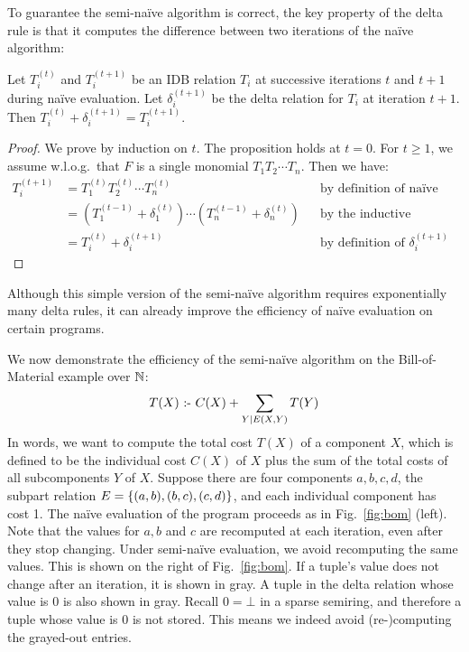 To guarantee the semi-na\"ive algorithm is correct,
the key property of the delta rule is that it computes the difference
 between two iterations of the na\"ive algorithm:
%
\begin{prop}
\label{thm:delta}
Let $T_i^{(t)}$ and $T_i^{(t+1)}$ be an IDB relation $T_i$ 
 at successive iterations $t$ and $t+1$ during na\"ive evaluation.
Let $\delta_i^{(t+1)}$ be the delta relation for $T_i$ at iteration $t+1$.
Then $T_i^{(t)} + \delta_i^{(t+1)} = T_i^{(t+1)}$.
\end{prop}
%
\begin{proof}
We prove by induction on $t$.
The proposition holds at $t=0$.
For $t\geq 1$, we assume w.l.o.g.\ that $F$ is a single monomial $T_1 T_2 \cdots T_n$.
Then we have:
\begin{align*}
T_i^{(t+1)} & = T_1^{(t)} T_2^{(t)} \cdots T_n^{(t)} && \text{by definition of na\"ive evaluation} \\ 
 & = (T_1^{(t-1)} + \delta_1^{(t)}) \cdots (T_n^{(t-1)} + \delta_n^{(t)}) && \text{by the inductive hypothesis} \\
 & = T_i^{(t)} + \delta_i^{(t+1)} && \text{by definition of $\delta_i^{(t+1)}$}
\end{align*}
\end{proof}

Although this simple version of the semi-na\"ive algorithm requires exponentially
 many delta rules, it can already improve the efficiency of na\"ive evaluation
 on certain programs.

\begin{ex}
\label{ex:sn-datalogo}
We now demonstrate the efficiency of the semi-na\"ive algorithm on the Bill-of-Material example 
 over $\mathbb N$:
%
$$ T(X) \text{ :- } C(X) + \sum_{Y \mid E(X, Y)} T(Y) $$
%
In words, we want to compute the total cost $T(X)$ of a component $X$, 
 which is defined to be the individual cost $C(X)$ of $X$ 
 plus the sum of the total costs of all subcomponents $Y$ of $X$.
Suppose there are four components $a, b, c, d$, 
 the subpart relation $E = \{ (a, b), (b, c), (c, d)\}$, 
 and each individual component has cost 1.
The na\"ive evaluation of the program proceeds as in Fig.~\ref{fig:bom} (left).
Note that the values for $a, b$ and $c$ are recomputed at each iteration, 
 even after they stop changing.
Under semi-na\"ive evaluation, we avoid recomputing the same values.
This is shown on the right of Fig.~\ref{fig:bom}.
If a tuple's value does not change after an iteration, 
 it is shown in gray.
A tuple in the delta relation whose value is 0 is also shown in gray.
Recall $0 = \bot$ in a sparse semiring,
 and therefore a tuple whose value is 0 is not stored.
This means we indeed avoid (re-)computing the grayed-out entries.
\end{ex}

